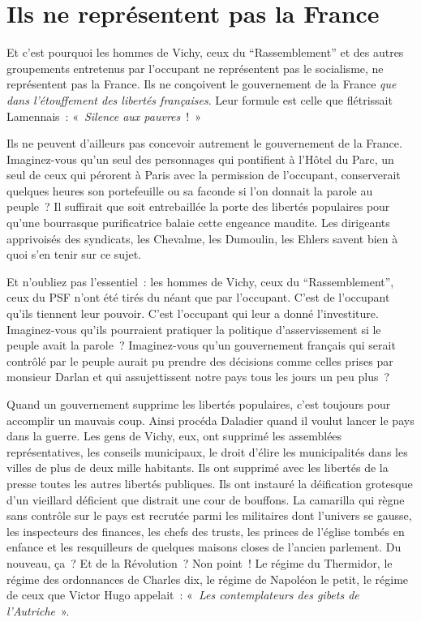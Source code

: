 \documentclass[french,twoside]{book} %
\begin{document}
\section[Ils ne représentent pas la France]{Ils ne représentent pas la France}
\noindent Et c’est pourquoi les hommes de Vichy, ceux du “Rassemblement” et des autres groupements entretenus par l’occupant ne représentent pas le socialisme, ne représentent pas la France. Ils ne conçoivent le gouvernement de la France \emph{que dans l’étouffement des libertés françaises}. Leur formule est celle que flétrissait Lamennais : « \emph{Silence aux pauvres} ! »\par
Ils ne peuvent d’ailleurs pas concevoir autrement le gouvernement de la France. Imaginez-vous qu’un seul des personnages qui pontifient à l’Hôtel du Parc, un seul de ceux qui pérorent à Paris avec la permission de l’occupant, conserverait quelques heures son portefeuille ou sa faconde si l’on donnait la parole au peuple ? Il suffirait que soit entrebaillée la porte des libertés populaires pour qu’une bourrasque purificatrice balaie cette engeance maudite. Les dirigeants apprivoisés des syndicats, les Chevalme, les Dumoulin, les Ehlers savent bien à quoi s’en tenir sur ce sujet.\par
Et n’oubliez pas l’essentiel : les hommes de Vichy, ceux du “Rassemblement”, ceux du PSF n’ont été tirés du néant que par l’occupant. C’est de l’occupant qu’ils tiennent leur pouvoir. C’est l’occupant qui leur a donné l’investiture. Imaginez-vous qu’ils pourraient pratiquer la politique d’asservissement si le peuple avait la parole ? Imaginez-vous qu’un gouvernement français qui serait contrôlé par le peuple aurait pu prendre des décisions comme celles prises par monsieur Darlan et qui assujettissent notre pays tous les jours un peu plus ?\par
Quand un gouvernement supprime les libertés populaires, c’est toujours pour accomplir un mauvais coup. Ainsi procéda Daladier quand il voulut lancer le pays dans la guerre. Les gens de Vichy, eux, ont supprimé les assemblées représentatives, les conseils municipaux, le droit d’élire les municipalités dans les villes de plus de deux mille habitants. Ils ont supprimé avec les libertés de la presse toutes les autres libertés publiques. Ils ont instauré la déification grotesque d’un vieillard déficient que distrait une cour de bouffons. La camarilla qui règne sans contrôle sur le pays est recrutée parmi les militaires dont l’univers se gausse, les inspecteurs des finances, les chefs des trusts, les princes de l’église tombés en enfance et les resquilleurs de quelques maisons closes de l’ancien parlement. Du nouveau, ça ? Et de la Révolution ? Non point ! Le régime du Thermidor, le régime des ordonnances de Charles dix, le régime de Napoléon le petit, le régime de ceux que Victor Hugo appelait : « \emph{Les contemplateurs des gibets de l’Autriche} ».
\end{document}
